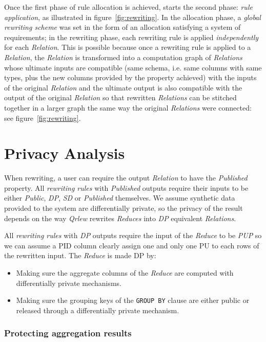 \documentclass{article}
\newcommand{\qrlew}{\emph{Qrlew}}
\begin{document}
    Once the first phase of rule allocation is achieved, starts the second phase: \emph{rule application}, as illustrated in figure~\ref{fig:rewriting}.
    In the allocation phase, a \emph{global rewriting scheme} was set in the form of an allocation satisfying a system of requirements; in the rewriting phase, each rewriting rule is applied \emph{independently} for each \emph{Relation}. This is possible because once a rewriting rule is applied to a \emph{Relation}, the \emph{Relation} is transformed into a computation graph of \emph{Relations} whose ultimate inputs are compatible (same schema, i.e. same columns with same types, plus the new columns provided by the property achieved) with the inputs of the original \emph{Relation} and the ultimate output is also compatible with the output of the original \emph{Relation} so that rewritten \emph{Relations} can be stitched together in a larger graph the same way the original \emph{Relations} were connected: see figure~\ref{fig:rewriting}.
    
    \section{Privacy Analysis}
    \label{sec:privacy_analysis}
    
    When rewriting, a user can require the output \emph{Relation} to have the \emph{Published} property. All \emph{rewriting rules} with \emph{Published} outputs require their inputs to be either \emph{Public}, \emph{DP}, \emph{SD} or \emph{Published} themselves. We assume synthetic data provided to the system are differentially private, so the privacy of the result depends on the way \qrlew{} rewrites \emph{Reduces} into \emph{DP} equivalent \emph{Relations}.
    
    All \emph{rewriting rules} with \emph{DP} outputs require the input of the \emph{Reduce} to be \emph{PUP} so we can assume a PID column clearly assign one and only one PU to each rows of the rewritten input. The \emph{Reduce} is made DP by:
    \begin{itemize}
        \item Making sure the aggregate columns of the \emph{Reduce} are computed with differentially private mechanisms.
        \item Making sure the grouping keys of the \texttt{GROUP BY} clause are either public or released through a differentially private mechanism.
    \end{itemize}
    
    \subsubsection{Protecting aggregation results}
    
\end{document}
